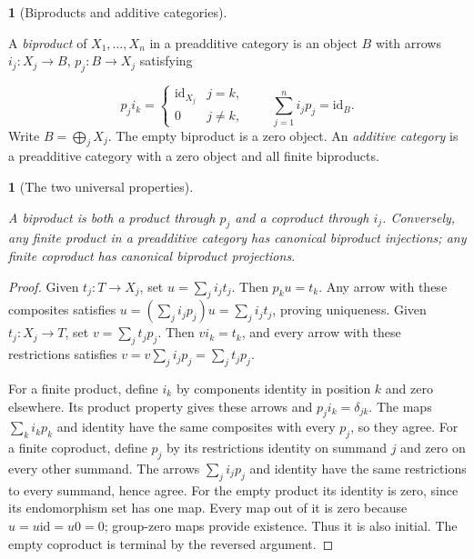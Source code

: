 \documentclass[11pt,a4paper]{article}
\newcommand{\mathheading}{}
\theoremstyle{plain}
\newtheorem*{plainstatement}{\mathheading}
\theoremstyle{definition}
\newtheorem*{definitionstatement}{\mathheading}
\newenvironment{mathstatement}[3]{\renewcommand{\mathheading}{#1 #2}\begin{plainstatement}[#3]}{\end{plainstatement}}
\newenvironment{mathdefinition}[3]{\renewcommand{\mathheading}{#1 #2}\begin{definitionstatement}[#3]}{\end{definitionstatement}}
\begin{document}
\begin{mathdefinition}{Definition}{3.4}{Biproducts and additive categories}
\label{env-3-4}

A \emph{biproduct} of \(X_1,\ldots,X_n\) in a preadditive category is an object \(B\) with arrows \(i_j:X_j\to B\), \(p_j:B\to X_j\) satisfying

\[p_j i_k=\begin{cases}\mathrm{id}_{X_j}&j=k,\\0&j\ne k,\end{cases}\qquad \sum_{j=1}^n i_jp_j=\mathrm{id}_B.\] 
Write \(B=\bigoplus_jX_j\). The empty biproduct is a zero object. An \emph{additive category} is a preadditive category with a zero object and all finite biproducts.


\par{}\par

\end{mathdefinition}
 
\begin{mathstatement}{Proposition}{3.5}{The two universal properties}
\label{env-3-5}

A biproduct is both a product through \(p_j\) and a coproduct through \(i_j\). Conversely, any finite product in a preadditive category has canonical biproduct injections; any finite coproduct has canonical biproduct projections.


\par{}\par

\end{mathstatement}
 
\begin{proof}

Given \(t_j:T\to X_j\), set \(u=\sum_j i_jt_j\). Then \(p_ku=t_k\). Any arrow with these composites satisfies \(u=(\sum_j i_jp_j)u=\sum_j i_jt_j\), proving uniqueness. Given \(t_j:X_j\to T\), set \(v=\sum_j t_jp_j\). Then \(v i_k=t_k\), and every arrow with these restrictions satisfies \(v=v\sum_j i_jp_j=\sum_j t_jp_j\).


For a finite product, define \(i_k\) by components identity in position \(k\) and zero elsewhere. Its product property gives these arrows and \(p_j i_k=\delta_{jk}\). The maps \(\sum_k i_kp_k\) and identity have the same composites with every \(p_j\), so they agree. For a finite coproduct, define \(p_j\) by its restrictions identity on summand \(j\) and zero on every other summand. The arrows \(\sum_j i_jp_j\) and identity have the same restrictions to every summand, hence agree. For the empty product its identity is zero, since its endomorphism set has one map. Every map out of it is zero because \(u=u\mathrm{id}=u0=0\); group-zero maps provide existence. Thus it is also initial. The empty coproduct is terminal by the reversed argument.


\end{proof}
 
\end{document}
